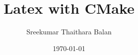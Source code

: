 \documentclass{article}
\begin{document}
    \title{Latex with CMake}
    \author{Sreekumar Thaithara Balan}
    \date{\today}
    \maketitle

    

    
    
\end{document}

